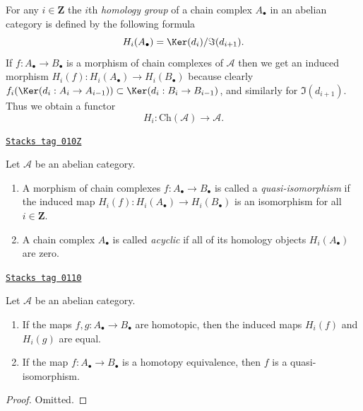 For any $i \in \mathbf{Z}$ the $i$th {\it homology group}
of a chain complex $A_\bullet$ in an abelian category is defined by
the following formula
$$
H_i(A_\bullet) = \Ker(d_i)/\Im(d_{i + 1}).
$$
If $f : A_\bullet \to B_\bullet$ is a morphism of chain
complexes of $\mathcal{A}$ then we get an induced
morphism $H_i(f) : H_i(A_\bullet) \to H_i(B_\bullet)$
because clearly
$f_i(\Ker(d_i : A_i \to A_{i - 1})) \subset
\Ker(d_i : B_i \to B_{i - 1})$, and similarly
for $\Im(d_{i + 1})$.
Thus we obtain a functor
$$
H_i : \text{Ch}(\mathcal{A}) \longrightarrow \mathcal{A}.
$$

\begin{definition}
\label{homology-definition-quasi-isomorphism}
\href{https://stacks.math.columbia.edu/tag/010Z}{\texttt{Stacks tag 010Z}}

Let $\mathcal{A}$ be an abelian category.
\begin{enumerate}
\item A morphism of chain complexes $f : A_\bullet \to B_\bullet$
is called a {\it quasi-isomorphism} if the induced
map $H_i(f) : H_i(A_\bullet) \to H_i(B_\bullet)$
is an isomorphism for all $i \in \mathbf{Z}$.
\item A chain complex $A_\bullet$ is called
{\it acyclic} if all of its homology objects
$H_i(A_\bullet)$ are zero.
\end{enumerate}
\end{definition}


\begin{lemma}
\label{homology-lemma-map-homology-homotopy}
\href{https://stacks.math.columbia.edu/tag/0110}{\texttt{Stacks tag 0110}}

Let $\mathcal{A}$ be an abelian category.
\begin{enumerate}
\item If the maps $f, g : A_\bullet \to B_\bullet$ are
homotopic, then the induced maps $H_i(f)$ and $H_i(g)$
are equal.
\item If the map $f : A_\bullet \to B_\bullet$ is a homotopy
equivalence, then $f$ is a quasi-isomorphism.
\end{enumerate}
\end{lemma}

\begin{proof}
Omitted.
\end{proof}

